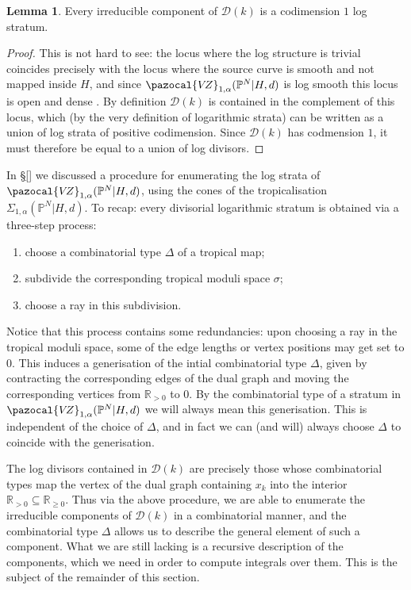 \documentclass[11pt]{amsart}
\newcommand{\PP}{\mathbb P}
\newcommand{\VZ}{\pazocal{V\!Z}}
\newcommand{\Dcal}{\mathcal{D}}
\newcommand{\RR}{\mathbb{R}}
\theoremstyle{definition}
\newtheorem{lemma}[thm]{Lemma}
\theoremstyle{definition}
\begin{document}
\begin{lemma} \label{Lemma components are log divisors} Every irreducible component of $\Dcal(k)$ is a codimension $1$ log stratum.\end{lemma}
\begin{proof} This is not hard to see: the locus where the log structure is trivial coincides precisely with the  locus where the source curve is smooth and not mapped inside $H$, and since $\VZ_{1,\alpha}(\PP^N|H,d)$ is log smooth this locus is open and dense \cite{Niziol}. By definition $\Dcal(k)$ is contained in the  complement of this locus, which (by the very definition of logarithmic strata) can be written as a union of log strata of positive codimension. Since $\Dcal(k)$ has codmension $1$, it must therefore be equal to a union of log divisors.\end{proof}
In \S \ref{} we discussed a procedure for enumerating the log strata of $\VZ_{1,\alpha}(\PP^N|H,d)$, using the cones of the tropicalisation $\Sigma_{1,\alpha}(\PP^N|H,d)$. To recap: every divisorial logarithmic stratum is obtained via a three-step process:
\begin{enumerate}
\item choose a combinatorial type $\Delta$ of a tropical map;
\item subdivide the corresponding tropical moduli space $\sigma$;
\item choose a ray in this subdivision.
\end{enumerate}
Notice that this process contains some redundancies: upon choosing a ray in the tropical moduli space, some of the edge lengths or vertex positions may get set to $0$. This induces a generisation of the intial combinatorial type $\Delta$, given by contracting the corresponding edges of the dual graph and moving the corresponding vertices from $\RR_{>0}$ to $0$. By the combinatorial type of a stratum in $\VZ_{1,\alpha}(\PP^N|H,d)$ we will always mean this generisation. This is independent of the choice of $\Delta$, and in fact we can (and will) always choose $\Delta$ to coincide with the generisation.

The log divisors contained in $\Dcal(k)$ are precisely those whose  combinatorial types map the vertex of the dual graph containing $x_k$  into the interior $\RR_{>0} \subseteq \RR_{\geq 0}$. Thus via the above procedure, we are able to enumerate the irreducible components of $\Dcal(k)$ in a combinatorial manner, and the combinatorial type $\Delta$ allows us to describe the general element of such a component. What we are still lacking is a recursive description of the components, which we need in order to compute integrals over them. This is the subject of the remainder of this section.
\end{document}
